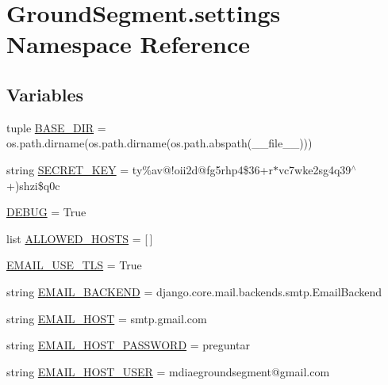 \hypertarget{namespace_ground_segment_1_1settings}{}\section{Ground\+Segment.\+settings Namespace Reference}
\label{namespace_ground_segment_1_1settings}
\subsection*{Variables}
\begin{DoxyCompactItemize}
\item 
tuple \hyperlink{namespace_ground_segment_1_1settings_a96d9de6863371f2594631eee01ef0600}{B\+A\+S\+E\+\_\+\+D\+I\+R} = os.\+path.\+dirname(os.\+path.\+dirname(os.\+path.\+abspath(\+\_\+\+\_\+file\+\_\+\+\_\+)))
\item 
string \hyperlink{namespace_ground_segment_1_1settings_a962d63c2c779045196141e0ac3e0415a}{S\+E\+C\+R\+E\+T\+\_\+\+K\+E\+Y} = \textquotesingle{}ty\%av@!oii2d@fg5rhp4\$36+r$\ast$vc7wke2sg4q39$^\wedge$+)shzi\$q0c\textquotesingle{}
\item 
\hyperlink{namespace_ground_segment_1_1settings_a7398b478a987ae21647fbb08b265ad10}{D\+E\+B\+U\+G} = True
\item 
list \hyperlink{namespace_ground_segment_1_1settings_ae76a78e05b49fb40b628ba756d926bc9}{A\+L\+L\+O\+W\+E\+D\+\_\+\+H\+O\+S\+T\+S} = \mbox{[}$\,$\mbox{]}
\item 
\hyperlink{namespace_ground_segment_1_1settings_a8f145226f6aaa8becf7066ef790b389b}{E\+M\+A\+I\+L\+\_\+\+U\+S\+E\+\_\+\+T\+L\+S} = True
\item 
string \hyperlink{namespace_ground_segment_1_1settings_ada1dcaeb590c4106b8bd01b0bf16d8c7}{E\+M\+A\+I\+L\+\_\+\+B\+A\+C\+K\+E\+N\+D} = \textquotesingle{}django.\+core.\+mail.\+backends.\+smtp.\+Email\+Backend\textquotesingle{}
\item 
string \hyperlink{namespace_ground_segment_1_1settings_a543f885a8ff97df8e4e3c215d0ef42a8}{E\+M\+A\+I\+L\+\_\+\+H\+O\+S\+T} = \textquotesingle{}smtp.\+gmail.\+com\textquotesingle{}
\item 
string \hyperlink{namespace_ground_segment_1_1settings_aedd7c143f3020b0a1156e678dc353726}{E\+M\+A\+I\+L\+\_\+\+H\+O\+S\+T\+\_\+\+P\+A\+S\+S\+W\+O\+R\+D} = \textquotesingle{}preguntar\textquotesingle{}
\item 
string \hyperlink{namespace_ground_segment_1_1settings_a0bc4395f3eefc35a5ad7741002256650}{E\+M\+A\+I\+L\+\_\+\+H\+O\+S\+T\+\_\+\+U\+S\+E\+R} = \textquotesingle{}mdiaegroundsegment@gmail.\+com\textquotesingle{}

\end{DoxyCompactItemize}
